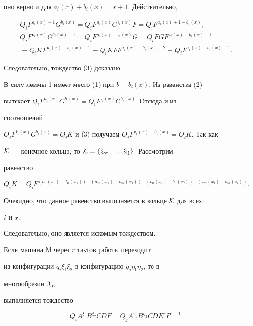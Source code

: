 \begin{pf}
оно верно и для $a_i(x)+b_i(x)=r+1$. Действительно, 


\begin{gather*} 


Q_i F^{a_i(x)+1}G^{b_i(x)}=Q_i F^{a_i(x)}G^{b_i(x)}F= 


Q_i F^{a_i(x)+1-b_i(x)},\\ 


Q_i F^{a_i(x)}G^{b_i(x)+1}=Q_i F^{a_i(x)-b_i(x)}G= 


Q_i F G F^{a_i(x)-b_i(x)-1}= \\ 


=Q_i K F^{a_i(x)-b_i(x)-1}=Q_i K F F^{a_i(x)-b_i(x)-2}= 


Q_i F^{a_i(x)-b_i(x)-1}. 


\end{gather*} 


Следовательно, тождество (3) доказано. 


 


В силу леммы 1 имеет место (1) при $b=b_i(x)$. Из равенства (2)  


вытекает $Q_i F^{a_i(x)}G^{b_i(x)}=Q_i F^{b_i(x)}G^{b_i(x)}$. Отсюда и из 


соотношений  


$Q_i F^{b_i(x)}G^{b_i(x)}=Q_i K$ и (3) получаем $Q_i 


F^{a_i(x)-b_i(x)}=Q_i K$. Так как  


$\cal K$ --- конечное кольцо, то $\cal K=\{x_1,\dotsc,x_l\}$. Рассмотрим 


равенство 


$$ 


Q_i K=Q_i 


F^{(a_0(x_1)-b_0(x_1))\dotsc (a_m(x_1)-b_m(x_1))\dotsc 


(a_0(x_l)-b_0(x_l))\dotsc(a_m(x_l)-b_m(x_l))}. 


$$ 


Очевидно, что данное равенство выполняется в кольце $\cal K$ для всех 


$i$ и $x$.  


Следовательно, оно является искомым тождеством. 


\end{pf} 


 


\begin{lem} 


Если машина $\mathrm M$ через $r$ тактов работы переходит  


из конфигурации $q_i\xi_1\xi_2$ в конфигурацию $q_j\eta_1\eta_2$, то в 


многообразии $\frak X_n$ 


выполняется тождество 


\begin{equation} 


Q_i A^{\xi_1}B^{\xi_2}C D F=Q_j A^{\eta_1}B^{\eta_2}C D E^r F^{r+1}. 


\end{equation} 


\end{lem} 


